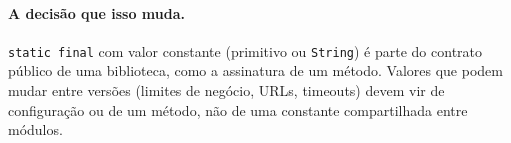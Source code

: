 \paragraph{A decisão que isso muda.}
\texttt{static final} com valor constante (primitivo ou
\texttt{String}) é parte do contrato público de uma biblioteca, como a
assinatura de um método. Valores que podem mudar entre versões (limites
de negócio, URLs, timeouts) devem vir de configuração ou de um método,
não de uma constante compartilhada entre módulos.
